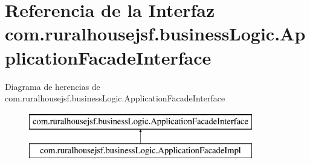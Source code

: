 \hypertarget{interfacecom_1_1ruralhousejsf_1_1business_logic_1_1_application_facade_interface}{}\section{Referencia de la Interfaz com.\+ruralhousejsf.\+business\+Logic.\+Application\+Facade\+Interface}
\label{interfacecom_1_1ruralhousejsf_1_1business_logic_1_1_application_facade_interface}
Diagrama de herencias de com.\+ruralhousejsf.\+business\+Logic.\+Application\+Facade\+Interface\begin{figure}[H]
\begin{center}
\leavevmode
\includegraphics[height=2.000000cm]{interfacecom_1_1ruralhousejsf_1_1business_logic_1_1_application_facade_interface}
\end{center}
\end{figure}

